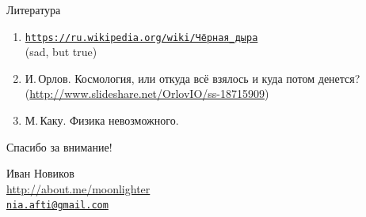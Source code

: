 \documentclass[usenames,dvipsnames,pdftex,unicode,hidelinks]{beamer}
\begin{document}
  \begin{frame}{Литература}
    \begin{enumerate}
      \item
        \href{https://ru.wikipedia.org/wiki/\%D0\%A7\%D1\%91\%D1\%80\%D0\%BD\%D0\%B0\%D1\%8F_\%D0\%B4\%D1\%8B\%D1\%80\%D0\%B0}{\texttt{https://ru.wikipedia.org/wiki/Чёрная\_дыра}}
        \\(sad, but true)
      \item И.\,Орлов. Космология, или откуда всё взялось и куда потом денется?
        (\url{http://www.slideshare.net/OrlovIO/ss-18715909})
      \item М.\,Каку. Физика невозможного.
    \end{enumerate}
  \end{frame}

  \begin{frame}[plain]
    \begin{center}
      { \Huge Спасибо за внимание! }

      \vspace{1cm}

      Иван Новиков\\
      \url{http://about.me/moonlighter}\\
      \href{mailto:nia.afti@gmail.com}{\nolinkurl{nia.afti@gmail.com} }
      
    \end{center}
  \end{frame}
\end{document}
